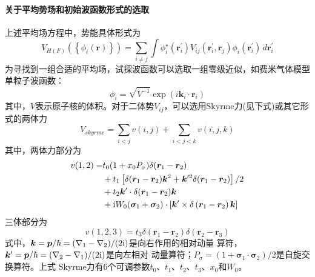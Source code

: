 \paragraph*{关于平均势场和初始波函数形式的选取}
上述平均场方程中，势能具体形式为
\begin{equation}
    V_{H(F)}\left( \left\{ \phi_i(\bm{r}) \right\} \right) = \sum_{i \neq j} \int 
    \phi_i^{\star}(\bm{r}_i^{\prime}) V_{ij}(\bm{r}_i^{\prime}, \bm{r}_j) \phi_{i}(\bm{r}_i^{\prime})
    \,d\bm{r}_i^{\prime}
    \label{eq:mean-field}
\end{equation}
为寻找到一组合适的平均场，试探波函数可以选取一组零级近似，如费米气体模型单粒子波函数：
\begin{equation}
    \phi_i = \sqrt{V^{-1}} \exp{(i \bm{k}_i \cdot \bm{r}_i)}
    \label{eq:fermi-gas-eigen}
\end{equation}
其中，$V$表示原子核的体积。对于二体势$V_{ij}$，可以选用Skyrme力(见下式)或其它形式的两体力
\begin{equation}
    V_{skyrme} = \sum_{i<j} v(i, j) + \sum_{i<j<k} v(i, j, k)
    \label{eq:skyrme-forc}
\end{equation}
其中，两体力部分为
\begin{equation}
    \begin{aligned}
        v(1, 2) =& t_0 (1 + x_0 P_{\sigma})\delta(\bm{r}_1 - \bm{r}_2) \\
            & + t_1\left[ \delta(\bm{r}_1 - \bm{r}_2) \bm{k}^{2}
              + \bm{k}^{\prime 2}\delta(\bm{r}_1 - \bm{r}_2)\right] / 2 \\
            & + t_2\bm{k}^{\prime} \cdot \delta(\bm{r}_1 - \bm{r}_2) \bm{k} \\
            & + {\rm i} W_0(\bm{\sigma}_1 + \bm{\sigma}_2)\cdot \left[ 
            \bm{k}^{\prime} \times \delta\left( \bm{r}_1 - \bm{r}_2 \right) \bm{k}\right]
    \end{aligned}
    \label{eq:skyrme-tow-body-forc}
\end{equation}
三体部分为
\begin{equation}
    v(1, 2, 3) = t_3 \delta(\bm{r}_1 - \bm{r}_2) \delta(\bm{r}_2 - \bm{r}_3)
    \label{eq:skyrm-three-body-forc}
\end{equation}
式中，$\bm{k} = \bm{p}/\hbar = (\nabla_{1} - \nabla_{2}) / (2{\rm i})$是向右作用的相对动量
算符，$\bm{k}^{\prime} = \bm{p}/\hbar = (\nabla_{2} - \nabla_{1}) / (2{\rm i})$是向左相对
动量算符；$P_{\sigma} = (1 + \bm{\sigma}_1 \cdot \bm{\sigma}_2) / 2$是自旋交换算符。上式
Skyrme力有6个可调参数$t_0$、$t_1$、$t_2$、$t_3$、$x_0$和$W_0$。

